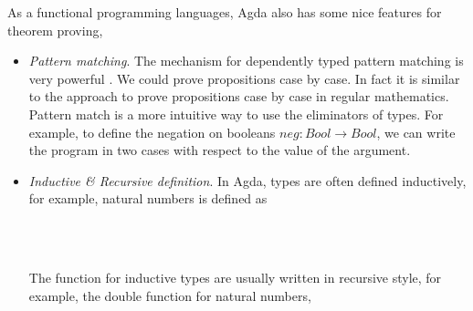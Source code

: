 \begin{itemize}

\end{itemize}

As a functional programming languages, Agda also has some nice features for theorem proving,

\begin{itemize}

\item \textit{Pattern matching}. The mechanism for dependently typed pattern matching is very powerful \cite{alti:pisigma-new}. We could prove propositions case by case. In fact it is similar to the approach to prove propositions case by case in regular mathematics. Pattern match is a more intuitive way to use the eliminators of types. For example, to define the negation on booleans $neg : Bool \to Bool$, we can write the program in two cases with respect to the value of the argument.

\item \textit{Inductive \& Recursive definition}. In Agda, types are often defined inductively, for example, natural numbers is defined as

\begin{code}\>\<%
\>  \AgdaSymbol{:}  \<%
\\
\>[0]\<[2]%
\>[2] \AgdaSymbol{:} \<%
\\
\>[0]\<[2]%
\>[2] \<[7]%
\>[7]\AgdaSymbol{:} \AgdaSymbol{(} \AgdaSymbol{:} \AgdaSymbol{)}  \<%
\>\<\end{code}

The function for inductive types are usually written in recursive style, for example, the double function for natural numbers,

\begin{code}\>\<%
\\
\> \AgdaSymbol{:}   \<%
\\
\>  \AgdaSymbol{=} \<%
\\
\> \AgdaSymbol{(} \AgdaSymbol{)} \AgdaSymbol{=}  \AgdaSymbol{(} \AgdaSymbol{(} \AgdaSymbol{))}\<%
\>\<\end{code}


\end{itemize}
